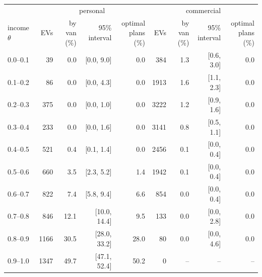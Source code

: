 \begin{tabular}{lrrrrrrrr}\toprule
 & \multicolumn{4}{c}{personal} & \multicolumn{4}{c}{commercial} \\
\cmidrule(lr){2-5}\cmidrule(lr){6-9} income $\theta$ & EVs & \shortstack{by van\\(\%)} & \shortstack{95\%\\interval} & \shortstack{optimal\\plans (\%)} & EVs & \shortstack{by van\\(\%)} & \shortstack{95\%\\interval} & \shortstack{optimal\\plans (\%)} \\ \midrule
0.0--0.1 & 39 & 0.0 & [0.0, 9.0] & 0.0 & 384 & 1.3 & [0.6, 3.0] & 0.0 \\
0.1--0.2 & 86 & 0.0 & [0.0, 4.3] & 0.0 & 1913 & 1.6 & [1.1, 2.3] & 0.0 \\
0.2--0.3 & 375 & 0.0 & [0.0, 1.0] & 0.0 & 3222 & 1.2 & [0.9, 1.6] & 0.0 \\
0.3--0.4 & 233 & 0.0 & [0.0, 1.6] & 0.0 & 3141 & 0.8 & [0.5, 1.1] & 0.0 \\
0.4--0.5 & 521 & 0.4 & [0.1, 1.4] & 0.0 & 2456 & 0.1 & [0.0, 0.4] & 0.0 \\
0.5--0.6 & 660 & 3.5 & [2.3, 5.2] & 1.4 & 1942 & 0.1 & [0.0, 0.4] & 0.0 \\
0.6--0.7 & 822 & 7.4 & [5.8, 9.4] & 6.6 & 854 & 0.0 & [0.0, 0.4] & 0.0 \\
0.7--0.8 & 846 & 12.1 & [10.0, 14.4] & 9.5 & 133 & 0.0 & [0.0, 2.8] & 0.0 \\
0.8--0.9 & 1166 & 30.5 & [28.0, 33.2] & 28.0 & 80 & 0.0 & [0.0, 4.6] & 0.0 \\
0.9--1.0 & 1347 & 49.7 & [47.1, 52.4] & 50.2 & 0 & -- & -- & -- \\
\bottomrule\end{tabular}

